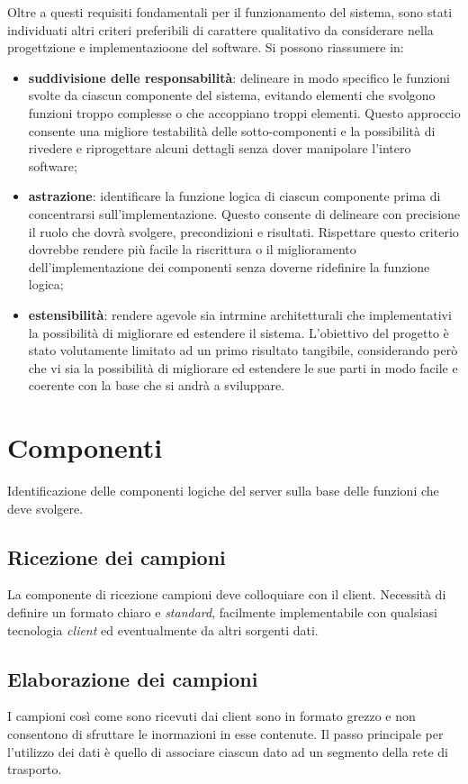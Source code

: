 Oltre a questi requisiti fondamentali per il funzionamento del sistema, sono stati individuati altri criteri preferibili di carattere qualitativo da considerare nella progettzione e implementazioone del software. Si possono riassumere in:
\begin{itemize}
\item \textbf{suddivisione delle responsabilità}: delineare in modo specifico le funzioni svolte da ciascun componente del sistema, evitando elementi che svolgono funzioni troppo complesse o che accoppiano troppi elementi. Questo approccio consente una migliore testabilità delle sotto-componenti e la possibilità di rivedere e riprogettare alcuni dettagli senza dover manipolare l'intero software;
\item \textbf{astrazione}: identificare la funzione logica di ciascun componente prima di concentrarsi sull'implementazione. Questo consente di delineare con precisione il ruolo che dovrà svolgere, precondizioni e risultati. Rispettare questo criterio dovrebbe rendere più facile la riscrittura o il miglioramento dell'implementazione dei componenti senza doverne ridefinire la funzione logica;
\item \textbf{estensibilità}: rendere agevole sia intrmine architetturali che implementativi la possibilità di migliorare ed estendere il sistema. L'obiettivo del progetto è stato volutamente limitato ad un primo risultato tangibile, considerando però che vi sia la possibilità di migliorare ed estendere le sue parti in modo facile e coerente con la base che si andrà a sviluppare.
\end{itemize}

\section{Componenti}
Identificazione delle componenti logiche del server sulla base delle funzioni che deve svolgere.
\subsection{Ricezione dei campioni}
La componente di ricezione campioni deve colloquiare con il client. Necessità di definire un formato chiaro e \emph{standard}, facilmente implementabile con qualsiasi tecnologia \emph{client} ed eventualmente da altri sorgenti dati.
\subsection{Elaborazione dei campioni}
I campioni così come sono ricevuti dai client sono in formato grezzo e non consentono di sfruttare le inormazioni in esse contenute. Il passo principale per l'utilizzo dei dati è quello di associare ciascun dato ad un segmento della rete di trasporto. 
